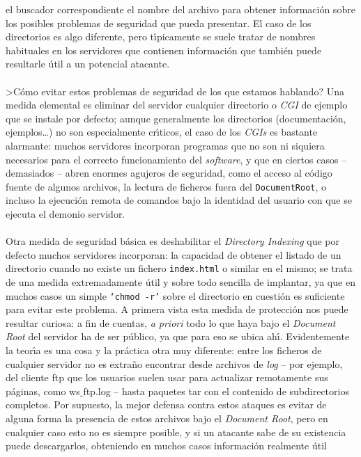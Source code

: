 el buscador correspondiente el nombre del archivo para obtener informaci\'on
sobre los posibles problemas de seguridad que pueda presentar. El caso de los
directorios es algo diferente, pero t\'{\i}picamente se suele tratar de nombres
habituales en los servidores que contienen informaci\'on que tambi\'en puede
resultarle \'util a un potencial atacante.\\
\\>C\'omo evitar estos problemas de seguridad de los que estamos hablando? Una
medida elemental es eliminar del servidor cualquier directorio o {\it CGI} de
ejemplo que se instale por defecto; aunque generalmente los directorios 
(documentaci\'on, ejemplos\ldots) no son especialmente cr\'{\i}ticos, el caso 
de los {\it CGIs} es bastante alarmante: muchos servidores incorporan programas
que no son ni siquiera necesarios para el correcto funcionamiento del {\it 
software}, y que en ciertos casos -- demasiados -- abren enormes agujeros de
seguridad, como el acceso al c\'odigo fuente de algunos archivos, la lectura de
ficheros fuera del {\tt DocumentRoot}, o incluso la ejecuci\'on remota de
comandos bajo la identidad del usuario con que se ejecuta el demonio servidor.\\
\\Otra medida de seguridad b\'asica es deshabilitar el {\it Directory Indexing}
que por defecto muchos servidores incorporan: la capacidad de obtener el
listado de un directorio cuando no existe un fichero {\tt index.html} o similar 
en el mismo; se trata de una medida extremadamente \'util y sobre todo sencilla
de implantar, ya que en muchos casos un simple {\tt `chmod -r'} sobre el 
directorio en cuesti\'on es suficiente para evitar este problema. A primera 
vista esta medida de protecci\'on nos puede resultar curiosa: a fin de cuentas,
{\it a priori} todo lo que haya bajo el {\it Document Root} del servidor ha de
ser p\'ublico, ya que para eso se ubica ah\'{\i}. Evidentemente la teor\'{\i}a
es una cosa y la pr\'actica otra muy diferente: entre los ficheros de cualquier
servidor no es extra\~no encontrar desde archivos de {\it log} -- por ejemplo,
del cliente {\sc ftp} que los usuarios suelen usar para actualizar remotamente
sus p\'aginas, como {\sc ws$\_$ftp.log} -- hasta paquetes {\sc tar} con el
contenido de subdirectorios completos. Por supuesto, la mejor defensa contra
estos ataques es evitar de alguna forma la presencia de estos archivos bajo el 
{\it Document Root}, pero en cualquier caso esto no es siempre posible, y si un 
atacante sabe de su existencia 
puede descargarlos, obteniendo en muchos casos informaci\'on realmente \'util
